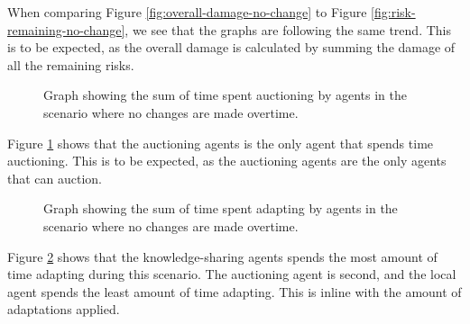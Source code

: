 When comparing Figure \ref{fig:overall-damage-no-change} to Figure \ref{fig:risk-remaining-no-change}, we see that the graphs are following the same trend. This is to be expected, as the overall damage is calculated by summing the damage of all the remaining risks.

\begin{figure}[H]
    \centering
        
    \caption{Graph showing the sum of time spent auctioning by agents in the scenario where no changes are made overtime.}
    \label{fig:auctioning-time-no-change}
\end{figure}

Figure \ref{fig:auctioning-time-no-change} shows that the auctioning agents is the only agent that spends time auctioning. This is to be expected, as the auctioning agents are the only agents that can auction.

\begin{figure}[H]
    \centering
        
    \caption{Graph showing the sum of time spent adapting by agents in the scenario where no changes are made overtime.}
    \label{fig:adapting-time-no-change}
\end{figure}

Figure \ref{fig:adapting-time-no-change} shows that the knowledge-sharing agents spends the most amount of time adapting during this scenario. The auctioning agent is second, and the local agent spends the least amount of time adapting. This is inline with the amount of adaptations applied.
